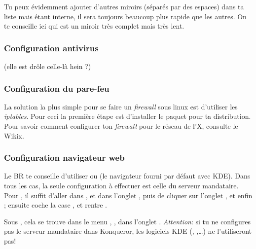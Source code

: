 Tu peux évidemment ajouter d'autres miroirs (séparés par des espaces) dans ta liste mais
 étant interne, il sera toujours beaucoup plus rapide que les autres. On te
conseille ici  qui est un miroir très complet mais très lent.



\subsubsection{Configuration antivirus}

{(elle est drôle celle-là hein ?)}


\subsubsection{Configuration du pare-feu}

La solution la plus simple pour se faire un \emph{firewall} sous linux est d'utiliser les \emph{iptables}. Pour ceci la première étape est
d'installer le paquet  pour ta distribution. Pour savoir comment configurer ton \emph{firewall} pour le réseau de l'X, consulte le Wikix.

\subsubsection{Configuration navigateur web}

 Le BR te conseille d'utiliser  ou
 (le navigateur fourni par défaut avec KDE). Dans tous les cas, la seule
configuration à effectuer est celle du serveur mandataire. Pour , il suffit d'aller dans
,  et dans l'onglet , puis de cliquer sur l'onglet
, et enfin  ; ensuite coche la case , et rentre .

Sous , cela se trouve dans le menu , ,
dans l'onglet . \emph{Attention}: si tu ne configures pas le serveur mandataire dans Konqueror,
les logiciels KDE (, ,\dots) ne l'utiliseront pas!


\pagebreak

